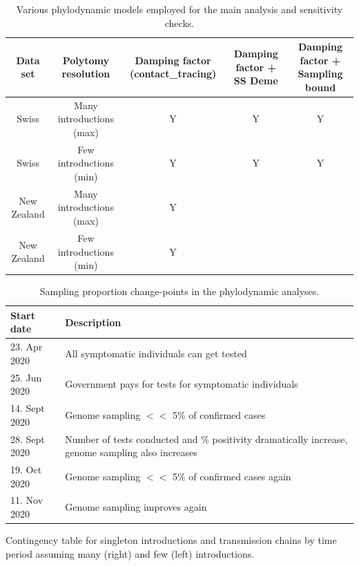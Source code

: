 \documentclass[9pt,twoside,lineno]{pnas-new}
\begin{document}
\begin{table}[H]
\caption{Various phylodynamic models employed for the main analysis and sensitivity checks.}
\label{tab:phylo-models}
\begin{tabular}{ccccc}
Data set & Polytomy resolution & Damping factor (contact\_tracing) & Damping factor + SS Deme & Damping factor + Sampling bound \\
\midrule
Swiss & Many introductions (max) & Y & Y & Y \\
Swiss & Few introductions (min) & Y & Y & Y \\
New Zealand & Many introductions (max) & Y & & \\
New Zealand & Few introductions (min) & Y & & \\
\bottomrule
\end{tabular}
\newline
{}
\end{table}

\newpage
\begin{table}[H]
\centering
\caption{Sampling proportion change-points in the phylodynamic analyses.}
\label{tab:CHE_samp_prob_change_dates}
\begin{tabular}{ll}
Start date & Description \\
\midrule
23. Apr 2020 & All symptomatic individuals can get tested \\
25. Jun 2020 & Government pays for tests for symptomatic individuals \\
14. Sept 2020 & Genome sampling $<<$ 5\% of confirmed cases \\
28. Sept 2020 & Number of tests conducted and \% positivity dramatically increase, genome sampling also increases \\
19. Oct 2020 & Genome sampling $<<$ 5\% of confirmed cases again \\
11. Nov 2020 & Genome sampling improves again \\
\bottomrule
\end{tabular}
\end{table}

\newpage
\begin{table}[H]
\caption{Contingency table for singleton introductions and transmission chains by time period assuming many (right) and few (left)  introductions.}
\label{tab:lockdown-contingency}


\end{table}

\newpage


\FloatBarrier


\end{document}
